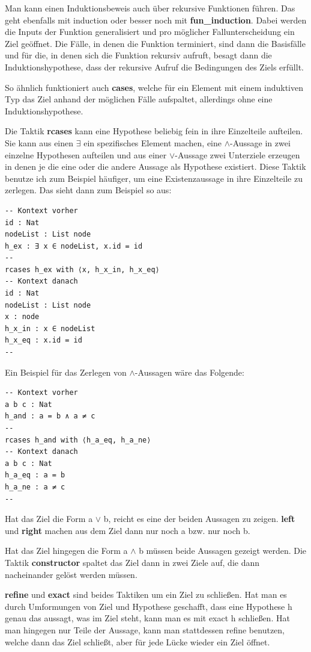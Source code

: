 Man kann einen Induktionsbeweis auch über rekursive Funktionen führen.
Das geht ebenfalls mit induction oder besser noch mit \textbf{fun\_induction}.
Dabei werden die Inputs der Funktion generalisiert und pro möglicher Fallunterscheidung ein Ziel geöffnet.
Die Fälle, in denen die Funktion terminiert, sind dann die Basisfälle
und für die, in denen sich die Funktion rekursiv aufruft, besagt dann die Induktionshypothese, dass der rekursive Aufruf die Bedingungen des Ziels erfüllt.

So ähnlich funktioniert auch \textbf{cases}, welche für ein Element mit einem induktiven Typ das Ziel anhand der möglichen Fälle aufspaltet, allerdings ohne eine Induktionshypothese.

Die Taktik \textbf{rcases} kann eine Hypothese beliebig fein in ihre Einzelteile aufteilen.
Sie kann aus einen $\exists$ ein spezifisches Element machen, eine $\land$-Aussage in zwei einzelne Hypothesen aufteilen
und aus einer $\lor$-Aussage zwei Unterziele erzeugen in denen je die eine oder die andere Aussage als Hypothese existiert.
Diese Taktik benutze ich zum Beispiel häufiger, um eine Existenzaussage in ihre Einzelteile zu zerlegen.
Das sieht dann zum Beispiel so aus:
\newpage
\begin{lstlisting}
-- Kontext vorher
id : Nat
nodeList : List node
h_ex : ∃ x ∈ nodeList, x.id = id
--
rcases h_ex with ⟨x, h_x_in, h_x_eq⟩
-- Kontext danach
id : Nat
nodeList : List node
x : node
h_x_in : x ∈ nodeList
h_x_eq : x.id = id
--
\end{lstlisting}

Ein Beispiel für das Zerlegen von $\land$-Aussagen wäre das Folgende:

\begin{lstlisting}
-- Kontext vorher
a b c : Nat
h_and : a = b ∧ a ≠ c
--
rcases h_and with ⟨h_a_eq, h_a_ne⟩
-- Kontext danach
a b c : Nat
h_a_eq : a = b
h_a_ne : a ≠ c
--
\end{lstlisting}

Hat das Ziel die Form a $\lor$ b, reicht es eine der beiden Aussagen zu zeigen.
\textbf{left} und \textbf{right} machen aus dem Ziel dann nur noch a bzw. nur noch b.

Hat das Ziel hingegen die Form a $\land$ b müssen beide Aussagen gezeigt werden.
Die Taktik \textbf{constructor} spaltet das Ziel dann in zwei Ziele auf, die dann nacheinander gelöst werden müssen.

\textbf{refine} und \textbf{exact} sind beides Taktiken um ein Ziel zu schließen.
Hat man es durch Umformungen von Ziel und Hypothese geschafft, dass eine Hypothese h genau das aussagt, was im Ziel steht, kann man es mit exact h schließen.
Hat man hingegen nur Teile der Aussage, kann man stattdessen refine benutzen, welche dann das Ziel schließt, aber für jede Lücke wieder ein Ziel öffnet.

